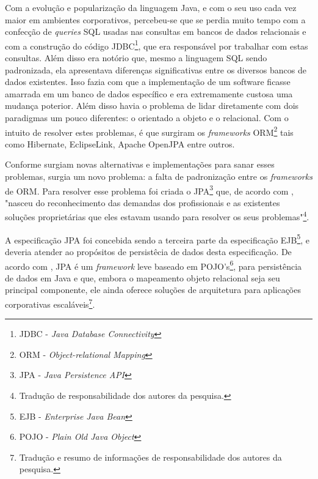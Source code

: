 
	\par Com a evolução e popularização da linguagem Java, e com o seu
uso cada vez maior em ambientes corporativos, percebeu-se que se perdia muito
tempo com a confecção de \textit{queries} SQL usadas nas consultas em bancos de
dados relacionais e com a construção do código JDBC\footnote{JDBC -
\textit{Java Database Connectivity}}, que era responsável por trabalhar com
estas consultas. Além disso era notório que, mesmo a linguagem SQL sendo
padronizada, ela apresentava diferenças significativas entre os diversos bancos
de dados existentes. Isso fazia com que a implementação de um software ficasse
amarrada em um banco de dados específico e era extremamente custosa uma mudança
poterior. Além disso havia o problema de lidar diretamente com dois paradigmas
um pouco diferentes: o orientado a objeto e o relacional. Com o intuito de
resolver estes problemas, é que surgiram os \textit{frameworks}
ORM\footnote{ORM - \textit{Object-relational Mapping}} tais como Hibernate,
EclipseLink, Apache OpenJPA entre outros.

	\par Conforme surgiam novas alternativas e implementações para sanar esses
problemas, surgia um novo problema: a falta de padronização entre os
\textit{frameworks} de ORM. Para resolver esse problema foi criada o
JPA\footnote{JPA - \textit{Java Persistence API}} que, de acordo com
, "nasceu do reconhecimento das demandas dos
profissionais e as existentes soluções proprietárias que eles estavam usando
para resolver os seus problemas"\footnote{Tradução de responsabilidade dos
autores da pesquisa.}. 
	
	\par A especificação JPA foi concebida sendo a terceira parte da
especificação EJB\footnote{EJB - \textit{Enterprise Java Bean}}, e deveria
atender ao propósitos de persistêcia de dados desta especificação.
De acordo com , JPA é um \textit{framework} leve
baseado em POJO's\footnote{POJO - \textit{Plain Old Java Object }}, para
persistência de dados em Java e que, embora o mapeamento objeto
relacional seja seu principal componente, ele ainda oferece soluções de
arquitetura para aplicações corporativas escaláveis\footnote{Tradução e resumo
de informações de responsabilidade dos autores da pesquisa.}.

